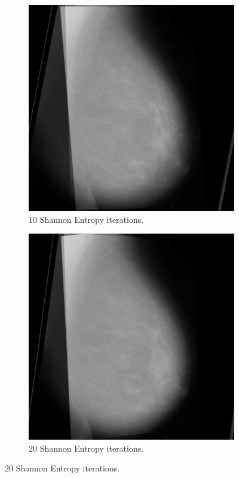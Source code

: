 \begin{figure}[H]
\begin{subfigure}[t]{0.3\textwidth}
        \includegraphics[width=\textwidth]{Appendix5/sample1/shannon/s-10-final.png}
        \caption{10 Shannon Entropy iterations.}
        \label{fig:app-10-shannon-sample1}
    \end{subfigure} \hfill
    \begin{subfigure}[t]{0.3\textwidth}
      \includegraphics[width=\textwidth]{Appendix5/sample1/shannon/shannon-20.png}
      \caption{20 Shannon Entropy iterations.}
      \label{fig:app-20-shannon-sample1}
    \end{subfigure}
\end{figure}

